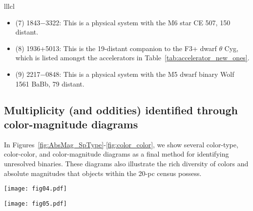 \documentclass[twocolumn,tighten,twocolappendix]{aastex631}
\begin{document}
\begin{deluxetable}{lllcl}
{\begin{itemize}
\item (7) 1843$-$3322: This is a physical system with the M6 star CE 507, 15{\farcs}0 distant.
\item (8) 1936+5013:  This is the 1{\farcm}9-distant companion to the F3+ dwarf $\theta$ Cyg, which is listed amongst the accelerators in Table~\ref{tab:accelerator_new_ones}.
\item (9) 2217$-$0848: This is a physical system with the M5 dwarf binary Wolf 1561 BaBb, 7{\farcs}9 distant.
\end{itemize}
}
\end{deluxetable}

\subsection{Multiplicity (and oddities) identified through color-magnitude diagrams\label{sec:color-magnitude_diagrams}}

In Figures~\ref{fig:AbsMag_SpType}-\ref{fig:color_color}, we show several color-type, color-color, and color-magnitude diagrams as a final method for identifying unresolved binaries. These diagrams also illustrate the rich diversity of colors and absolute magnitudes that objects within the 20-pc census possess.

\begin{figure*}
\texttt{[image: fig04.pdf]}
\caption{Various absolute magnitudes plotted against spectral type for the 20-pc census. See text for details.
\label{fig:AbsMag_SpType}}
\end{figure*}

\begin{figure*}
\texttt{[image: fig05.pdf]}
\caption{Absolute $G$-band magnitude plotted against various colors for the 20-pc census. See text for details. The spray of mostly black points (i.e., objects with no measured spectral types) to the left of the main sequence in the $G_{BP}-G$ vs.\ $M_G$ diagram and to the right of the main sequence in the $G-G_{RP}$ vs.\ $M_G$ diagram represents components in close binaries near the Gaia resolution limit. The $G_{BP}$ and $G_{RP}$ magnitudes are calculated from the fluxes in a 3.5$\times$2.1 arcsec$^2$ field, whereas the $G$ magnitudes are calculated from a profile fit to a much higher-resolution image (section 8 of \citealt{evans2018}). For binaries just above the Gaia resolution limit, this means that per-component BP and RP fluxes will often include light from the other object, whereas the $G$ flux will not (\citealt{halbwachs2022}). This effect pushes such objects blueward in $G_{BP}-G$ color and redward in $G-G_{RP}$ color, as these diagrams show.
\label{fig:MG_color}}
\end{figure*}
\end{document}
